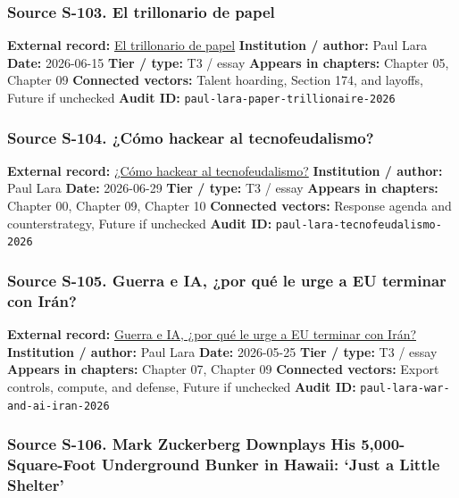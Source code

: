 \documentclass[
  american,
  11pt,
  letterpaper,
]{article}
\begin{document}
\subsubsection{Source S-103. El trillonario de
papel}\label{source-s-103-el-trillonario-de-papel}

\textbf{External record:}
\href{https://www.dineroenimagen.com/paul-lara/el-trillonario-de-papel/186905}{El
trillonario de papel} \textbf{Institution / author:} Paul Lara
\textbf{Date:} 2026-06-15 \textbf{Tier / type:} T3 / essay
\textbf{Appears in chapters:} Chapter 05, Chapter 09 \textbf{Connected
vectors:} Talent hoarding, Section 174, and layoffs, Future if unchecked
\textbf{Audit ID:} \texttt{paul-lara-paper-trillionaire-2026}

\subsubsection{Source S-104. ¿Cómo hackear al
tecnofeudalismo?}\label{source-s-104-c-mo-hackear-al-tecnofeudalismo}

\textbf{External record:}
\href{https://www.dineroenimagen.com/paul-lara/como-hackear-al-tecnofeudalismo/186955}{¿Cómo
hackear al tecnofeudalismo?} \textbf{Institution / author:} Paul Lara
\textbf{Date:} 2026-06-29 \textbf{Tier / type:} T3 / essay
\textbf{Appears in chapters:} Chapter 00, Chapter 09, Chapter 10
\textbf{Connected vectors:} Response agenda and counterstrategy, Future
if unchecked \textbf{Audit ID:} \texttt{paul-lara-tecnofeudalismo-2026}

\subsubsection{Source S-105. Guerra e IA, ¿por qué le urge a EU terminar
con
Irán?}\label{source-s-105-guerra-e-ia-por-qu-le-urge-a-eu-terminar-con-ir-n}

\textbf{External record:}
\href{https://www.dineroenimagen.com/paul-lara/guerra-e-ia-por-que-le-urge-eu-terminar-con-iran/186704}{Guerra
e IA, ¿por qué le urge a EU terminar con Irán?} \textbf{Institution /
author:} Paul Lara \textbf{Date:} 2026-05-25 \textbf{Tier / type:} T3 /
essay \textbf{Appears in chapters:} Chapter 07, Chapter 09
\textbf{Connected vectors:} Export controls, compute, and defense,
Future if unchecked \textbf{Audit ID:}
\texttt{paul-lara-war-and-ai-iran-2026}

\subsubsection{Source S-106. Mark Zuckerberg Downplays His
5,000-Square-Foot Underground Bunker in Hawaii: `Just a Little
Shelter'}\label{source-s-106-mark-zuckerberg-downplays-his-5-000-square-foot-underground-bunker-in-hawaii-just-a-little-shelter}
\end{document}
